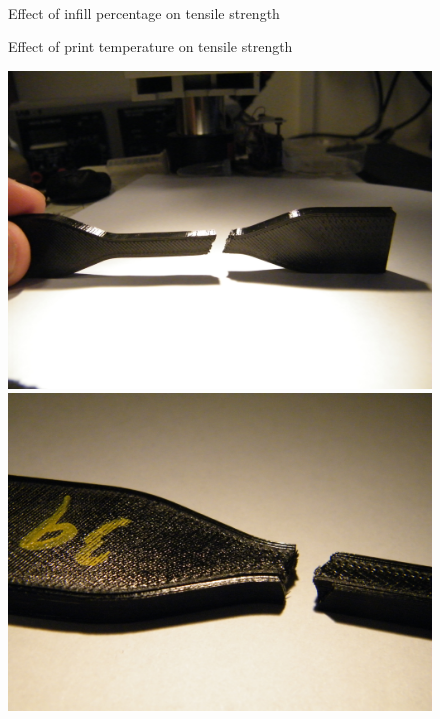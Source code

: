\documentclass[a4paper, 11pt, reqno]{report}
\begin{document}
\begin{figure}[h]
\begin{minipage}[b]{0.48\textwidth}
  \end{minipage}
  \\[1pt]
  \begin{minipage}[t]{0.48\textwidth}
    \caption{Effect of infill percentage on tensile strength}
  \end{minipage}
  \hfill
  \begin{minipage}[t]{0.48\textwidth}
    \caption{Effect of print temperature on tensile strength}
  \end{minipage}
\end{figure}
%
\clearpage
\begin{figure}[h!]
  \centering
  \begin{minipage}[b]{0.48\textwidth}
    \includegraphics[width=\textwidth]{3}
  \end{minipage}
  \hfill
  \begin{minipage}[b]{0.48\textwidth}
    \includegraphics[width=\textwidth]{8}

\end{minipage}
\end{figure}
\end{document}
